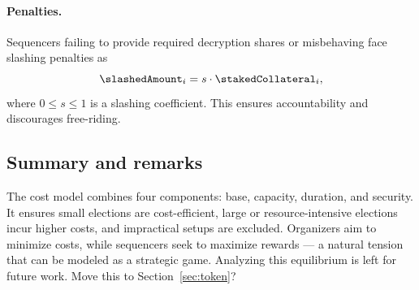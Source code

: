 \paragraph{Penalties.} Sequencers failing to provide required decryption shares or misbehaving face slashing penalties as 
\[
\slashedAmount_i = s \cdot \stakedCollateral_i,
\]
where $0 \leq s \leq 1$ is a slashing coefficient. This ensures accountability and discourages free-riding.

\subsection{Summary and remarks}

The cost model combines four components: base, capacity, duration, and security. It ensures small elections are cost-efficient, large or resource-intensive elections incur higher costs, and impractical setups are excluded. Organizers aim to minimize costs, while sequencers seek to maximize rewards — a natural tension that can be modeled as a strategic game. Analyzing this equilibrium is left for future work. {\color{blue}Move this to Section~\ref{sec:token}?}